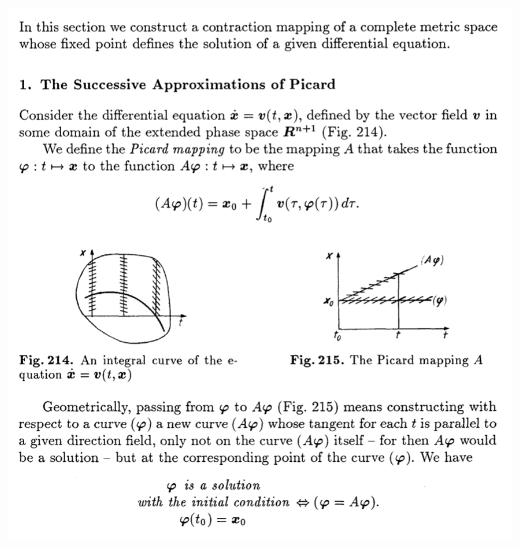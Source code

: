 \begin{mdframed}
\includegraphics[width=400pt]{img/differential-equations-picard-contraction-mapping-fixed-point-arnold.png}
\end{mdframed}

